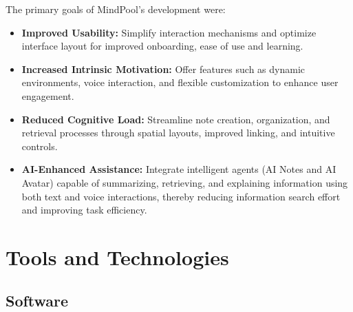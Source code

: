 \documentclass{CPP}
\begin{document}
The primary goals of MindPool's development were:
\begin{itemize}
    \item \textbf{Improved Usability:} Simplify interaction mechanisms and optimize interface layout for improved onboarding, ease of use and learning.
    \item \textbf{Increased Intrinsic Motivation:} Offer features such as dynamic environments, voice interaction, and flexible customization to enhance user engagement.
    \item \textbf{Reduced Cognitive Load:} Streamline note creation, organization, and retrieval processes through spatial layouts, improved linking, and intuitive controls.
    \item \textbf{AI-Enhanced Assistance:} Integrate intelligent agents (AI Notes and AI Avatar) capable of summarizing, retrieving, and explaining information using both text and voice interactions, thereby reducing information search effort and improving task efficiency.
\end{itemize}








\section{Tools and Technologies}

\subsection{Software}
\end{document}
